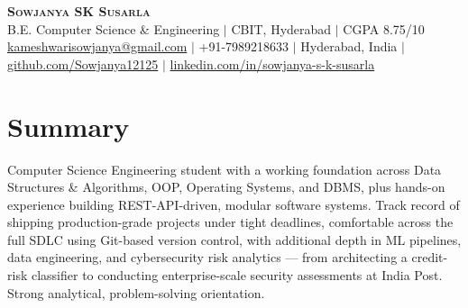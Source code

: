 \documentclass[a4paper,10pt]{article}
\begin{document}
\begin{center}
    \textbf{\Huge \scshape Sowjanya SK Susarla} \\ \vspace{3pt}
    \small B.E. Computer Science \& Engineering $\vert$ CBIT, Hyderabad $\vert$ CGPA 8.75/10 \\ \vspace{2pt}
    \small \href{mailto:kameshwarisowjanya@gmail.com}{kameshwarisowjanya@gmail.com} $\vert$
    +91-7989218633 $\vert$
    Hyderabad, India $\vert$
    \href{https://github.com/Sowjanya12125}{github.com/Sowjanya12125} $\vert$
    \href{https://www.linkedin.com/in/sowjanya-s-k-susarla-498632308/}{linkedin.com/in/sowjanya-s-k-susarla}
\end{center}

\section{Summary}
\small{Computer Science Engineering student with a working foundation across Data Structures \& Algorithms, OOP, Operating Systems, and DBMS, plus hands-on experience building REST-API-driven, modular software systems. Track record of shipping production-grade projects under tight deadlines, comfortable across the full SDLC using Git-based version control, with additional depth in ML pipelines, data engineering, and cybersecurity risk analytics --- from architecting a credit-risk classifier to conducting enterprise-scale security assessments at India Post. Strong analytical, problem-solving orientation.}

\end{document}
